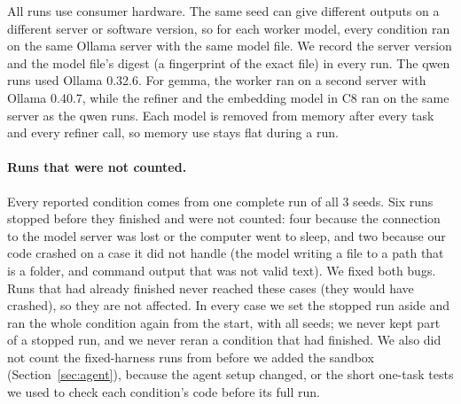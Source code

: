 All runs use consumer hardware. The same seed can give different outputs on a different server or
software version, so for each worker model, every condition ran on the same Ollama server with the
same model file. We record the server version and the model file's digest (a fingerprint of the
exact file) in every run. The qwen runs used Ollama 0.32.6. For gemma, the worker ran on a second
server with Ollama 0.40.7, while the refiner and the embedding model in C8 ran on the same server as
the qwen runs. Each model is removed from memory after every task and every refiner call, so memory
use stays flat during a run.

\paragraph{Runs that were not counted.}
Every reported condition comes from one complete run of all 3 seeds. Six runs stopped before they
finished and were not counted: four because the connection to the model server was lost or the
computer went to sleep, and two because our code crashed on a case it did not handle (the model
writing a file to a path that is a folder, and command output that was not valid text). We fixed
both bugs. Runs that had already finished never reached these cases (they would have crashed), so
they are not affected. In every case we set the stopped run aside and ran the whole condition again
from the start, with all seeds; we never kept part of a stopped run, and we never reran a condition
that had finished. We also did not count the fixed-harness runs from before we added the sandbox
(Section~\ref{sec:agent}), because the agent setup changed, or the short one-task tests we used to
check each condition's code before its full run.

